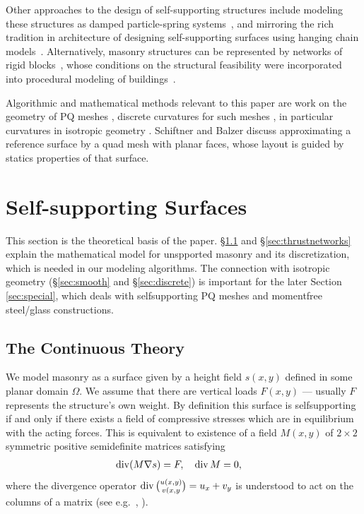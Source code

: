 \documentclass[review]{acmsiggraph}
\def\Div{\mathop{{\rm div}}\nolimits}
\begin{document}
Other approaches to the design of self-supporting structures
include modeling these structures as damped particle-spring
systems~\cite{Kilian2005,barnes09}, and mirroring the rich tradition in
architecture of designing self-supporting surfaces using hanging chain
models~\cite{Heyman98}. Alternatively, masonry structures can be
represented by networks of rigid blocks~\cite{Livesley92}, whose conditions
on the structural feasibility were incorporated into procedural modeling
of buildings~\cite{Whiting09}.

Algorithmic and mathematical methods relevant to this paper are work on
the geometry of PQ meshes \cite{Glymph2004,Liu2006},
discrete curvatures for such meshes \cite{Pottmann2007b,bobenko-2010-ct},
in particular curvatures in isotropic geometry \cite{Pottmann2007}.
Schiftner and Balzer  discuss approximating a
reference surface by a quad mesh with planar faces, whose layout is guided
by statics properties of that surface.


\section{Self-supporting Surfaces}

This section is the theoretical basis of the paper. \S\ref{ssec:cont}
and \S\ref{sec:thrustnetworks} explain the mathematical
model for unspported masonry and its discretization, which is needed in our
modeling algorithms. The connection
with isotropic geometry (\S\ref{sec:smooth} and \S\ref{sec:discrete})
is important for the later Section \ref{sec:special},
which deals with self\dash supporting PQ meshes and
moment\dash free steel\slash glass constructions.

\subsection{The Continuous Theory}
\label{ssec:cont}

We model masonry as a surface given by a height field $s(x,y)$
defined in some planar domain $\Omega$. We assume that there are vertical
loads $F(x,y)$ --- usually $F$ represents the structure's own weight. By
definition this surface is self\dash supporting if and only if there
exists a field of compressive stresses which are in equilibrium with the
acting forces. This is equivalent to existence of a field $M(x,y)$ of
$2\times 2$ symmetric positive semidefinite matrices satisfying
	\begin{align}
	\Div (M\nabla s) = F, \quad
	\Div M &= 0,
	  \label{eq:conds}
	\end{align}
 where the divergence operator $\Div{u(x,y)\choose v(x,y}= u_x + v_y$ is
understood to act on the columns of a matrix (see e.g.\
\cite{Fraternali2010}, \cite{Giaquinta1985}).
\end{document}
